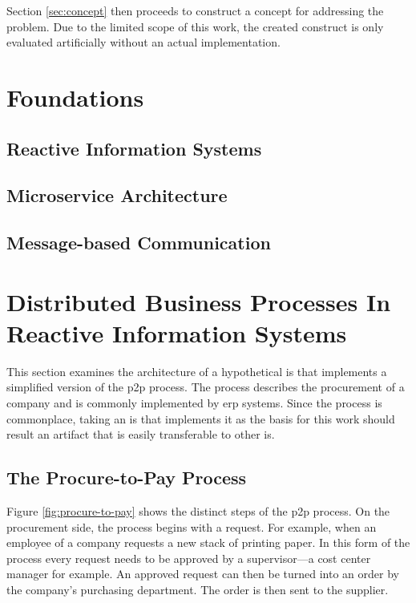 Section \ref{sec:concept} then proceeds to construct a concept for addressing the problem.
Due to the limited scope of this work, the created construct is only evaluated artificially without an actual implementation.

\section{Foundations}\label{sec:foundations}

\subsection{Reactive Information Systems}

\subsection{Microservice Architecture}

\subsection{Message-based Communication}

\section{Distributed Business Processes In Reactive Information Systems}\label{sec:problem}

This section examines the architecture of a hypothetical \gls{is} that implements a simplified version of the \gls{p2p} process.
The process describes the procurement of a company and is commonly implemented by \gls{erp} systems.
Since the process is commonplace, taking an \gls{is} that implements it as the basis for this work should result an artifact that is easily transferable to other \gls{is}.

\subsection{The Procure-to-Pay Process}

Figure \ref{fig:procure-to-pay} shows the distinct steps of the \gls{p2p} process.
On the procurement side, the process begins with a request.
For example, when an employee of a company requests a new stack of printing paper.
In this form of the process every request needs to be approved by a supervisor---a cost center manager for example.
An approved request can then be turned into an order by the company's purchasing department.
The order is then sent to the supplier.

